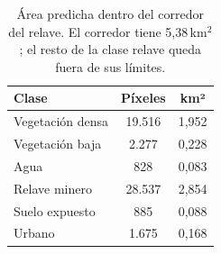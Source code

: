 \begin{table}[htbp]
 \centering
 \small
 \setlength{\tabcolsep}{4pt}
 \caption{Área predicha dentro del corredor del relave. El corredor tiene 5{,}38\,km$^2$; el resto de la clase relave queda fuera de sus límites.}
 \label{tab:area_corredor}
 \begin{tabular}{lcc}
  \toprule
  Clase & Píxeles & km² \\
  \midrule
  Vegetación densa & 19.516 & 1{,}952 \\
  Vegetación baja & 2.277 & 0{,}228 \\
  Agua & 828 & 0{,}083 \\
  Relave minero & 28.537 & 2{,}854 \\
  Suelo expuesto & 885 & 0{,}088 \\
  Urbano & 1.675 & 0{,}168 \\
  \bottomrule
 \end{tabular}
\end{table}
